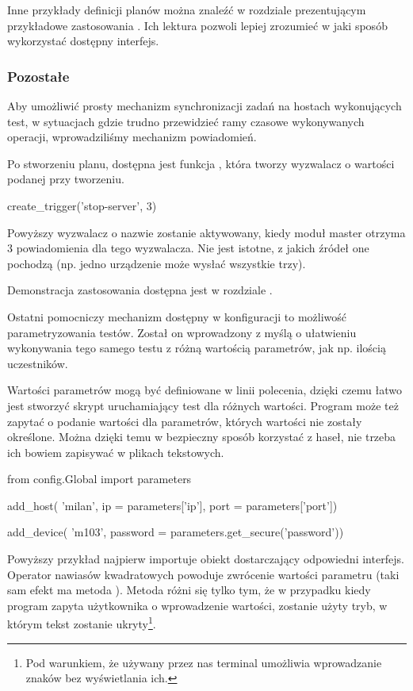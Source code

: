 \documentclass[00-praca-magisterska.tex]{subfiles}
\begin{document}
Inne przykłady definicji planów można znaleźć w rozdziale prezentującym
przykładowe zastosowania . Ich lektura
pozwoli lepiej zrozumieć w jaki sposób wykorzystać dostępny interfejs.

\label{arete-master-others}
\subsubsection{Pozostałe}

Aby umożliwić prosty mechanizm synchronizacji zadań na hostach wykonujących
test, w sytuacjach gdzie trudno przewidzieć ramy czasowe wykonywanych operacji,
wprowadziliśmy mechanizm powiadomień.

Po stworzeniu planu, dostępna jest funkcja , która tworzy
wyzwalacz o wartości podanej przy tworzeniu.

\begin{pythoncode}
  create_trigger('stop-server', 3)
\end{pythoncode}

Powyższy wyzwalacz o nazwie  zostanie aktywowany, kiedy moduł
master otrzyma 3 powiadomienia dla tego wyzwalacza. Nie jest istotne, z jakich
źródeł one pochodzą (np. jedno urządzenie może wysłać wszystkie trzy).

Demonstracja zastosowania dostępna jest w rozdziale .

Ostatni pomocniczy mechanizm dostępny w konfiguracji to możliwość
parametryzowania testów. Został on wprowadzony z myślą o ułatwieniu wykonywania
tego samego testu z różną wartością parametrów, jak np. ilością uczestników.

Wartości parametrów mogą być definiowane w linii polecenia, dzięki czemu łatwo
jest stworzyć skrypt uruchamiający test dla różnych wartości. Program może też
zapytać o podanie wartości dla parametrów, których wartości nie zostały
określone. Można dzięki temu w bezpieczny sposób korzystać z haseł, nie trzeba
ich bowiem zapisywać w plikach tekstowych.

\begin{pythoncode}
  from config.Global import parameters

  add_host(
      'milan',
      ip = parameters['ip'],
      port = parameters['port'])

  add_device(
      'm103',
      password = parameters.get_secure('password'))
\end{pythoncode}

Powyższy przykład najpierw importuje obiekt  dostarczający
odpowiedni interfejs. Operator nawiasów kwadratowych powoduje zwrócenie
wartości parametru  (taki sam efekt ma metoda ). Metoda
 różni się tylko tym, że w przypadku kiedy program zapyta
użytkownika o wprowadzenie wartości, zostanie użyty tryb, w którym tekst
zostanie ukryty\footnote{Pod warunkiem, że używany przez nas terminal umożliwia
wprowadzanie znaków bez wyświetlania ich.}.
\end{document}
